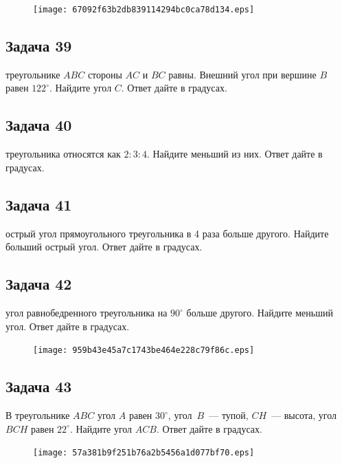 \documentclass[a4paper,10pt]{article} %
\begin{document}
\begin{spacing}{1.0}
{\begin{figure}{\texttt{[image: 67092f63b2db839114294bc0ca78d134.eps]}}\end{figure}
\subsection*{Задача 39}
 треугольнике $ABC$ стороны $AC$ и $BC$ равны. Внешний угол при вершине $B$ равен $122^\circ$. Найдите угол $C$. Ответ дайте в градусах.

\vspace{1cm}

\subsection*{Задача 40}
 треугольника относятся как $2:3:4$. Найдите меньший из них. Ответ дайте в градусах.


\subsection*{Задача 41}
 острый угол прямоугольного треугольника в 4 раза больше другого. Найдите больший острый угол. Ответ дайте в градусах.


\subsection*{Задача 42}
 угол равнобедренного треугольника на $90^\circ$ больше другого. Найдите меньший угол. Ответ дайте в градусах.

\vspace{1cm}

\begin{figure}{\texttt{[image: 959b43e45a7c1743be464e228c79f86c.eps]}}\end{figure}
\subsection*{Задача 43}
В треугольнике $ABC$ угол $A$ равен $30^\circ$, угол~$B$~--- тупой, $CH$~--- высота, угол $BCH$ равен $22^\circ$. Найдите угол $ACB$. Ответ дайте в градусах.

\vspace{1.5cm}

\begin{figure}{\texttt{[image: 57a381b9f251b76a2b5456a1d077bf70.eps]}}\end{figure}
}
\end{spacing}
\end{document}
